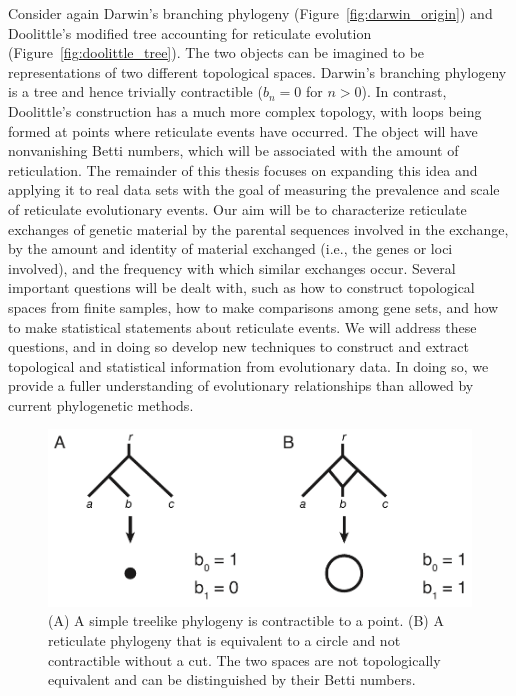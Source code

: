 Consider again Darwin's branching phylogeny (Figure~\ref{fig:darwin_origin}) and Doolittle's modified tree accounting for reticulate evolution (Figure~\ref{fig:doolittle_tree}).
The two objects can be imagined to be representations of two different topological spaces.
Darwin's branching phylogeny is a tree and hence trivially contractible ($b_n=0$ for $n>0$).
In contrast, Doolittle's construction has a much more complex topology, with loops being formed at points where reticulate events have occurred.
The object will have nonvanishing Betti numbers, which will be associated with the amount of reticulation.
The remainder of this thesis focuses on expanding this idea and applying it to real data sets with the goal of measuring the prevalence and scale of reticulate evolutionary events.
Our aim will be to characterize reticulate exchanges of genetic material by the parental sequences involved in the exchange, by the amount and identity of material exchanged (i.e., the genes or loci involved), and the frequency with which similar exchanges occur.
Several important questions will be dealt with, such as how to construct topological spaces from finite samples, how to make comparisons among gene sets, and how to make statistical statements about reticulate events.
We will address these questions, and in doing so develop new techniques to construct and extract topological and statistical information from evolutionary data.
In doing so, we provide a fuller understanding of evolutionary relationships than allowed by current phylogenetic methods.

\begin{figure}
\centering
\includegraphics[width=.8\columnwidth]{./fig/introduction/simple_tree_example.pdf}
\caption[Treelike and reticulate phylogenies]{(A) A simple treelike phylogeny is contractible to a point. (B) A reticulate phylogeny that is equivalent to a circle and not contractible without a cut. The two spaces are not topologically equivalent and can be distinguished by their Betti numbers.}
\label{intro:fig:simple_tree_example}
\end{figure}

